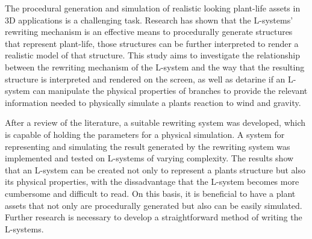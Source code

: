 
The procedural generation and simulation of realistic looking plant-life assets in 3D applications is a challenging task. Research has shown that the L-systems' rewriting mechanism is an effective means to procedurally generate structures that represent plant-life, those structures can be further interpreted to render a realistic model of that structure. This study aims to investigate the relationship between the rewriting mechanism of the L-system and the way that the resulting structure is interpreted and rendered on the screen, as well as detarine if an L-system can manipulate the physical properties of branches to provide the relevant information needed to physically simulate a plants reaction to wind and gravity. 

After a review of the literature, a suitable rewriting system was developed, which is capable of holding the parameters for a physical simulation. A system for representing and simulating the result generated by the rewriting system was implemented and tested on L-systems of varying complexity. The results show that an L-system can be created not only to represent a plants structure but also its physical properties, with the dissadvantage that the L-system becomes more cumbersome and difficult to read. On this basis, it is beneficial to have a plant assets that not only are procedurally generated but also can be easily simulated. Further research is necessary to develop a straightforward method of writing the L-systems.   